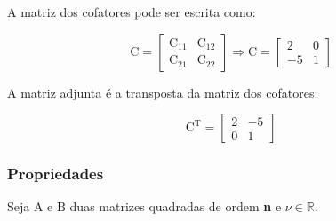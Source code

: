 \documentclass[a4paper,12pt]{article}
\begin{document}
A matriz dos cofatores pode ser escrita como:

$$ \text{C} = \begin{bmatrix}
\text{C}_{11} & \text{C}_{12}\\
\text{C}_{21} & \text{C}_{22}
\end{bmatrix} \Rightarrow \text{C} = \begin{bmatrix}
2 & 0 \\
-5 & 1
\end{bmatrix} $$

A matriz adjunta é a transposta da matriz dos cofatores:

$$ \text{C}^{\text{T}} = \begin{bmatrix}
2 & -5 \\
0 & 1
\end{bmatrix} $$

\subsubsection{Propriedades}

Seja $ \text{A} $ e $ \text{B} $ duas matrizes quadradas de ordem \textbf{n} e $ \nu \in \mathbb{R}$.
\end{document}
